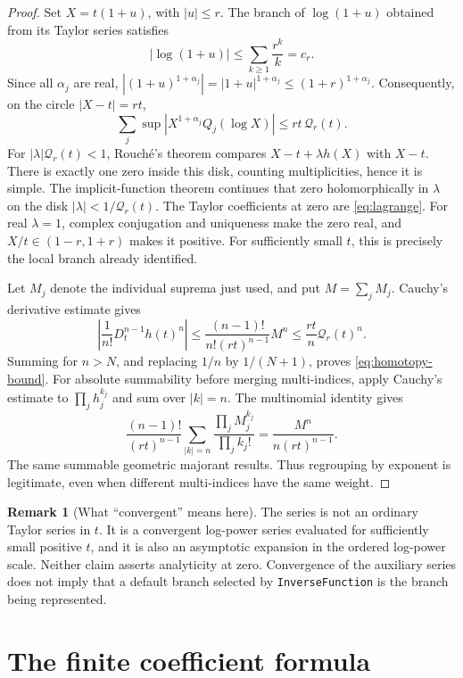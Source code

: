 \documentclass[11pt,a4paper]{article}
\theoremstyle{definition}
\newtheorem{remark}[theorem]{Remark}
\begin{document}
\begin{proof}
Set \(X=t(1+u)\), with \(|u|\le r\). The branch of \(\log(1+u)\) obtained
from its Taylor series satisfies
\[
 |\log(1+u)|\le\sum_{k\ge1}\frac{r^k}{k}=c_r.
\]
Since all \(\alpha_j\) are real,
\(|(1+u)^{1+\alpha_j}|=|1+u|^{1+\alpha_j}\le(1+r)^{1+\alpha_j}\).
Consequently, on the circle \(|X-t|=rt\),
\[
 \sum_j\sup|X^{1+\alpha_j}Q_j(\log X)|
 \le rt\,\mathcal Q_r(t).
\]
For \(|\lambda|\mathcal Q_r(t)<1\), Rouch\'e's theorem compares
\(X-t+\lambda h(X)\) with \(X-t\). There is exactly one zero inside this
disk, counting multiplicities, hence it is simple. The implicit-function
theorem continues that zero holomorphically in \(\lambda\) on the disk
\(|\lambda|<1/\mathcal Q_r(t)\). The Taylor coefficients at zero are
\eqref{eq:lagrange}. For real \(\lambda=1\), complex conjugation and uniqueness
make the zero real, and \(X/t\in(1-r,1+r)\) makes it positive. For sufficiently
small \(t\), this is precisely the local branch already identified.

Let \(M_j\) denote the individual suprema just used, and put
\(M=\sum_jM_j\). Cauchy's derivative estimate gives
\[
 \left|\frac1{n!}D_t^{n-1}h(t)^n\right|
 \le\frac{(n-1)!}{n!(rt)^{n-1}}M^n
 \le\frac{rt}{n}\mathcal Q_r(t)^n.
\]
Summing for \(n>N\), and replacing \(1/n\) by \(1/(N+1)\), proves
\eqref{eq:homotopy-bound}.
For absolute summability before merging multi-indices, apply Cauchy's
estimate to \(\prod_jh_j^{k_j}\) and sum over \(|k|=n\). The multinomial
identity gives
\[
 \frac{(n-1)!}{(rt)^{n-1}}
 \sum_{|k|=n}\frac{\prod_jM_j^{k_j}}{\prod_j k_j!}
 =\frac{M^n}{n(rt)^{n-1}}.
\]
The same summable geometric majorant results. Thus regrouping by exponent is
legitimate, even when different multi-indices have the same weight.
\end{proof}

\begin{remark}[What ``convergent'' means here]
The series is not an ordinary Taylor series in \(t\). It is a convergent
log-power series evaluated for sufficiently small positive \(t\), and it is
also an asymptotic expansion in the ordered log-power scale. Neither claim
asserts analyticity at zero. Convergence of the auxiliary series does not
imply that a default branch selected by \texttt{InverseFunction} is the
branch being represented.
\end{remark}

\section{The finite coefficient formula}
\end{document}
